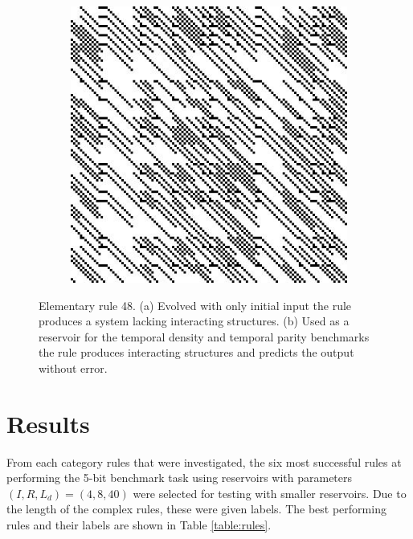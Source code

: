 \documentclass{elsarticle}
\begin{document}
\begin{multicols}{2}
\begin{figure}[H]
\begin{subfigure}[]{0.475\linewidth}
  \caption{}
  \end{subfigure}
\begin{subfigure}[]{0.475\linewidth}
  \includegraphics[width=\linewidth]{rule48_reservoir.jpg}
  \caption{}
  \end{subfigure}
  \caption{Elementary rule 48. (a) Evolved with only initial input the rule 
     produces a system lacking interacting structures. (b) Used as a reservoir 
        for the temporal density and temporal parity benchmarks the rule 
           produces interacting structures and predicts the output without 
              error.}
     \label{rule48}
     \end{figure}

\section{Results}\label{results}
From each category rules that were investigated, the six most successful rules 
    at performing the 5-bit benchmark task using reservoirs with parameters 
    $(I, R, L_{d}) = (4, 8, 40)$ were selected for testing with smaller  
    reservoirs. Due to the length of the complex rules, these were given 
    labels.  The best performing rules and their labels are shown in Table
\ref{table:rules}. 



\end{multicols}
\end{document}
